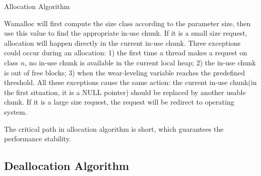 \documentclass[10pt, conference, compsocconf]{IEEEtran}
\begin{document}
\begin{algorithm}
\caption{Allocation Algorithm}\label{euclid}
\end{algorithm}

Wamalloc will first compute the size class according to the parameter size, 
then use this value to find the appropriate in-use chunk.
If it is a small size request, allocation will happen directly in the current in-use chunk.
Three exceptions could occur during an allocation:
1) the first time a thread makes a request on class $n$, no in-use chunk is available in the current local heap;
2) the in-use chunk is out of free blocks;
3) when the wear-leveling variable reaches the predefined threshold.
All these exceptions cause the same action:
the current in-use chunk(in the first situation, it is a NULL pointer) should be replaced by another usable chunk.
If it is a large size request, the request will be redirect to operating system.

The critical path in allocation algorithm is short, which guarantees the performance stability.

\subsection{Deallocation Algorithm}
\end{document}

